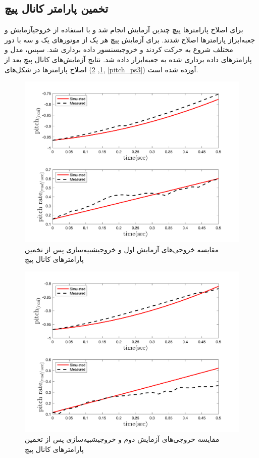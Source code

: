 \subsection{تخمین پارامتر کانال پیچ}
برای اصلاح پارامترها پیچ چندین آزمایش انجام شد و با استفاده از خروجیآزمایش و جعبه‌ابزاز
پارامترها اصلاح شدند.
برای آزمایش پیچ هر یک از موتورهای یک و سه  با دور مختلف شروع به حرکت کردند و خروجیسنسور داده برداری شد. سپس، مدل و پارامترهای داده برداری شده به جعبه‌ابزار
داده شد. نتایج آزمایش‌های کانال پیچ بعد از اصلاح پارامترها در شکل‌های
(\ref{pitch_ps1}, \ref{pitch_ps2}, \ref{pitch_ps3})
آورده شده است.

\begin{figure}[H]
	\includegraphics[width=12cm]{../../Figures/RCP/pitch_parameter_estimation/RCP_pitch_S1.png}
	\centering
	\caption{مقايسه خروجی‌های آزمايش اول و خروجیشبیه‌سازی پس از تخمین پارامترهای کانال پیچ}
	\label{pitch_ps1}
\end{figure}
\begin{figure}[H]
	\includegraphics[width=12cm]{../../Figures/RCP/pitch_parameter_estimation/RCP_pitch_S2.png}
	\centering
	\caption{مقايسه خروجی‌های آزمايش دوم و خروجیشبیه‌سازی پس از تخمین پارامترهای کانال پیچ}
	\label{pitch_ps2}
\end{figure}
